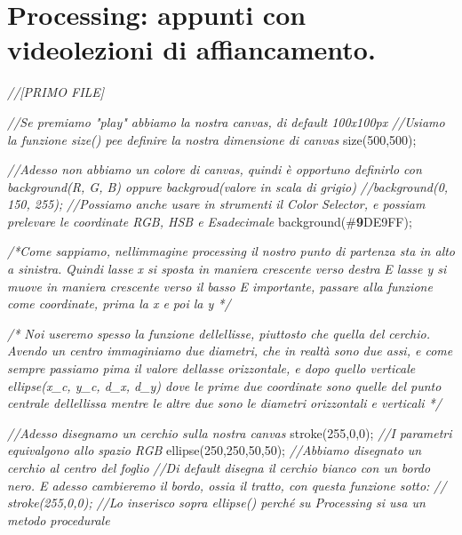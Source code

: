 \documentclass[
]{article}
\author{}
\date{}
\newenvironment{Shaded}{}{}
\newcommand{\CommentTok}[1]{\textcolor[rgb]{0.38,0.63,0.69}{\textit{#1}}}
\newcommand{\DecValTok}[1]{\textcolor[rgb]{0.25,0.63,0.44}{#1}}
\newcommand{\ErrorTok}[1]{\textcolor[rgb]{1.00,0.00,0.00}{\textbf{#1}}}
\newcommand{\FunctionTok}[1]{\textcolor[rgb]{0.02,0.16,0.49}{#1}}
\newcommand{\NormalTok}[1]{#1}
\newcommand{\OperatorTok}[1]{\textcolor[rgb]{0.40,0.40,0.40}{#1}}
\begin{document}
\section{Processing: appunti con videolezioni di
affiancamento.}\label{processing-appunti-con-videolezioni-di-affiancamento}

\begin{Shaded}
\begin{Highlighting}[]
\CommentTok{//[PRIMO FILE]}

\CommentTok{//Se premiamo "play" abbiamo la nostra canvas, di default 100x100px}
\CommentTok{//Usiamo la funzione \textquotesingle{}size()\textquotesingle{} pee definire la nostra dimensione di canvas}
\FunctionTok{size}\OperatorTok{(}\DecValTok{500}\OperatorTok{,}\DecValTok{500}\OperatorTok{);}

\CommentTok{//Adesso non abbiamo un colore di canvas, quindi è opportuno definirlo con \textquotesingle{}background(R, G, B) oppure backgroud(valore in scala di grigio)\textquotesingle{}}
  \CommentTok{//background(0, 150, 255);}
\CommentTok{//Possiamo anche usare in strumenti il Color Selector, e possiam prelevare le coordinate RGB, HSB e Esadecimale}
\FunctionTok{background}\OperatorTok{(}\NormalTok{\#}\ErrorTok{9}\NormalTok{DE9FF}\OperatorTok{);}

\CommentTok{/*Come sappiamo, nell\textquotesingle{}immagine processing il nostro punto di partenza sta in alto a sinistra.}
\CommentTok{Quindi l\textquotesingle{}asse x si sposta in maniera crescente verso destra}
\CommentTok{E l\textquotesingle{}asse y si muove in maniera crescente verso il basso}
\CommentTok{E\textquotesingle{} importante, passare alla funzione come coordinate, prima la \textquotesingle{}x\textquotesingle{} e poi la \textquotesingle{}y\textquotesingle{} */}

\CommentTok{/* Noi useremo spesso la funzione dell\textquotesingle{}ellisse, piuttosto che quella del cerchio.}
\CommentTok{Avendo un centro immaginiamo due diametri, che in realtà sono due assi, e come sempre passiamo pima il valore dell\textquotesingle{}asse orizzontale, e dopo quello verticale}
\CommentTok{  ellipse(x\_c, y\_c, d\_x, d\_y) dove le prime due coordinate sono quelle del punto centrale dell\textquotesingle{}ellissa mentre le altre due sono le diametri orizzontali e verticali */}

\CommentTok{//Adesso disegnamo un cerchio sulla nostra canvas}
\FunctionTok{stroke}\OperatorTok{(}\DecValTok{255}\OperatorTok{,}\DecValTok{0}\OperatorTok{,}\DecValTok{0}\OperatorTok{);} \CommentTok{//I parametri equivalgono allo spazio RGB}
\FunctionTok{ellipse}\OperatorTok{(}\DecValTok{250}\OperatorTok{,}\DecValTok{250}\OperatorTok{,}\DecValTok{50}\OperatorTok{,}\DecValTok{50}\OperatorTok{);}  \CommentTok{//Abbiamo disegnato un cerchio al centro del foglio}
\CommentTok{//Di default disegna il cerchio bianco con un bordo nero. E adesso cambieremo il bordo, ossia il tratto, con questa funzione sotto:}
\CommentTok{// stroke(255,0,0);}
\CommentTok{//Lo inserisco sopra \textquotesingle{}ellipse()\textquotesingle{} perché su Processing si usa un metodo procedurale}


\end{Highlighting}
\end{Shaded}
\end{document}
